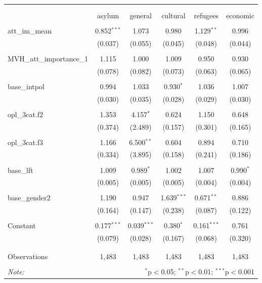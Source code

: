 
\begin{table}[!htbp] \centering 
  \caption{} 
  \label{} 
\begin{tabular}{@{\extracolsep{5pt}}lccccc} 
\\[-1.8ex]\hline 
\hline \\[-1.8ex] 
\\[-1.8ex] & asylum & general & cultural & refugees & economic \\ 
\hline \\[-1.8ex] 
 att\_im\_mean & 0.852$^{***}$ & 1.073 & 0.980 & 1.129$^{**}$ & 0.996 \\ 
  & (0.037) & (0.055) & (0.045) & (0.048) & (0.044) \\ 
  & & & & & \\ 
 MVH\_att\_importance\_1 & 1.115 & 1.000 & 1.009 & 0.950 & 0.930 \\ 
  & (0.078) & (0.082) & (0.073) & (0.063) & (0.065) \\ 
  & & & & & \\ 
 base\_intpol & 0.994 & 1.033 & 0.930$^{*}$ & 1.036 & 1.007 \\ 
  & (0.030) & (0.035) & (0.028) & (0.029) & (0.030) \\ 
  & & & & & \\ 
 opl\_3cat.f2 & 1.353 & 4.157$^{*}$ & 0.624 & 1.150 & 0.648 \\ 
  & (0.374) & (2.489) & (0.157) & (0.301) & (0.165) \\ 
  & & & & & \\ 
 opl\_3cat.f3 & 1.166 & 6.500$^{**}$ & 0.604 & 0.894 & 0.710 \\ 
  & (0.334) & (3.895) & (0.158) & (0.241) & (0.186) \\ 
  & & & & & \\ 
 base\_lft & 1.009 & 0.989$^{*}$ & 1.002 & 1.007 & 0.990$^{*}$ \\ 
  & (0.005) & (0.005) & (0.005) & (0.004) & (0.004) \\ 
  & & & & & \\ 
 base\_gender2 & 1.190 & 0.947 & 1.639$^{***}$ & 0.671$^{**}$ & 0.886 \\ 
  & (0.164) & (0.147) & (0.238) & (0.087) & (0.122) \\ 
  & & & & & \\ 
 Constant & 0.177$^{***}$ & 0.039$^{***}$ & 0.380$^{*}$ & 0.161$^{***}$ & 0.761 \\ 
  & (0.079) & (0.028) & (0.167) & (0.068) & (0.320) \\ 
  & & & & & \\ 
\hline \\[-1.8ex] 
Observations & 1,483 & 1,483 & 1,483 & 1,483 & 1,483 \\ 
\hline 
\hline \\[-1.8ex] 
\textit{Note:}  & \multicolumn{5}{r}{$^{*}$p$<$0.05; $^{**}$p$<$0.01; $^{***}$p$<$0.001} \\ 
\end{tabular} 
\end{table} 
